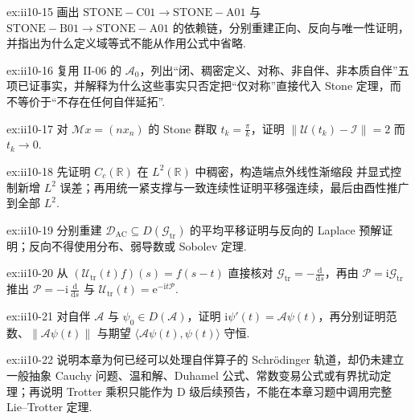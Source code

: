 \begin{FAExercise}{ex:ii10-15}
画出 \(\displaystyle\mathrm{STONE\!-C01}\to\mathrm{STONE\!-A01}\) 与 \(\displaystyle\mathrm{STONE\!-B01}\to\mathrm{STONE\!-A01}\) 的依赖链，分别重建正向、反向与唯一性证明，并指出为什么定义域等式不能从作用公式中省略.
\end{FAExercise}

\begin{FAExercise}[对称但非自伴的边界]{ex:ii10-16}
复用 II-06 的 \(\displaystyle\mathcal A_0\)，列出“闭、稠密定义、对称、非自伴、非本质自伴”五项已证事实，并解释为什么这些事实只否定把“仅对称”直接代入 Stone 定理，而不等价于“不存在任何自伴延拓”.
\end{FAExercise}

\begin{FAExercise}[强连续但非范数连续]{ex:ii10-17}
对 \(\displaystyle\mathcal Mx=(nx_n)\) 的 Stone 群取 \(\displaystyle t_k=\frac{\pi}{k}\)，证明 \(\displaystyle\|\mathcal U(t_k)-\mathcal I\|=2\) 而 \(\displaystyle t_k\to0\).
\end{FAExercise}

\begin{FAExercise}{ex:ii10-18}
先证明 \(\displaystyle C_c(\mathbb R)\) 在 \(\displaystyle L^2(\mathbb R)\) 中稠密，构造端点外线性渐缩段 并显式控制新增 \(\displaystyle L^2\) 误差；再用统一紧支撑与一致连续性证明平移强连续，最后由酉性推广到全部 \(\displaystyle L^2\).
\end{FAExercise}

\begin{FAExercise}[平移生成元的精确定义域]{ex:ii10-19}
分别重建 \(\displaystyle\mathcal D_{\mathrm{AC}}\subseteq D(\mathcal G_{\mathrm{tr}})\) 的平均平移证明与反向的 Laplace 预解证明；反向不得使用分布、弱导数或 Sobolev 定理.
\end{FAExercise}

\begin{FAExercise}[动量算子的符号]{ex:ii10-20}
从 \(\displaystyle(\mathcal U_{\mathrm{tr}}(t)f)(s)=f(s-t)\) 直接核对 \(\displaystyle\mathcal G_{\mathrm{tr}}=-\frac{\mathrm{d}}{\mathrm{d}s}\)，再由 \(\displaystyle\mathcal P=\mathrm{i}\mathcal G_{\mathrm{tr}}\) 推出 \(\displaystyle\mathcal P=-\mathrm{i}\,\frac{\mathrm{d}}{\mathrm{d}s}\) 与 \(\displaystyle\mathcal U_{\mathrm{tr}}(t)=\mathrm{e}^{-\mathrm{i}t\mathcal P}\).
\end{FAExercise}

\begin{FAExercise}{ex:ii10-21}
对自伴 \(\displaystyle\mathcal A\) 与 \(\displaystyle\psi_0\in D(\mathcal A)\)，证明 \(\displaystyle\mathrm{i}\psi'(t)=\mathcal A\psi(t)\)，再分别证明范数、\(\displaystyle\|\mathcal A\psi(t)\|\) 与期望 \(\displaystyle\langle\mathcal A\psi(t),\psi(t)\rangle\) 守恒.
\end{FAExercise}

\begin{FAExercise}[II-11 与 Trotter 边界]{ex:ii10-22}
说明本章为何已经可以处理自伴算子的 Schrödinger 轨道，却仍未建立一般抽象 Cauchy 问题、温和解、Duhamel 公式、常数变易公式或有界扰动定理；再说明 Trotter 乘积只能作为 D 级后续预告，不能在本章习题中调用完整 Lie--Trotter 定理.
\end{FAExercise}
